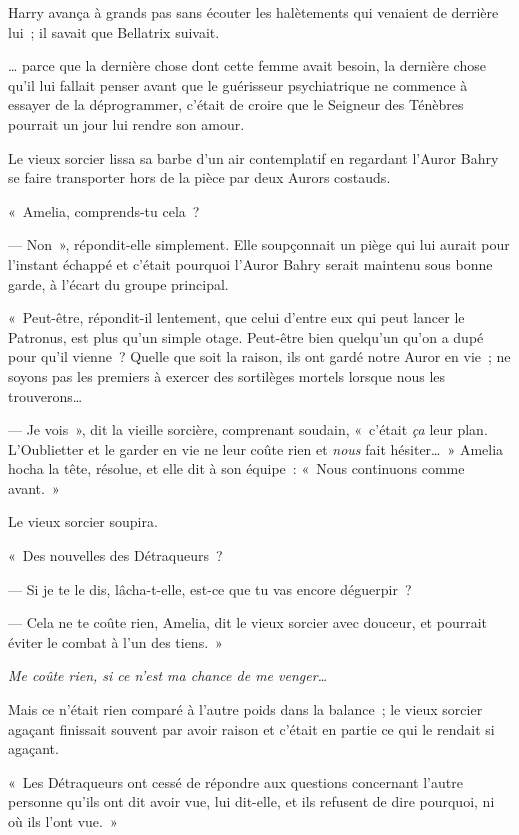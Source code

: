 Harry avança à grands pas sans écouter les halètements qui venaient de derrière lui~; il savait que Bellatrix suivait.

… parce que la dernière chose dont cette femme avait besoin, la dernière chose qu'il lui fallait penser avant que le guérisseur psychiatrique ne commence à essayer de la déprogrammer, c'était de croire que le Seigneur des Ténèbres pourrait un jour lui rendre son amour.

\later

Le vieux sorcier lissa sa barbe d'un air contemplatif en regardant l'Auror Bahry se faire transporter hors de la pièce par deux Aurors costauds.

«~Amelia, comprends-tu cela~?

--- Non~», répondit-elle simplement.
Elle soupçonnait un piège qui lui aurait pour l'instant échappé et c'était pourquoi l'Auror Bahry serait maintenu sous bonne garde, à l'écart du groupe principal.

«~Peut-être, répondit-il lentement, que celui d'entre eux qui peut lancer le Patronus, est plus qu'un simple otage.
Peut-être bien quelqu'un qu'on a dupé pour qu'il vienne~?
Quelle que soit la raison, ils ont gardé notre Auror en vie~; ne soyons pas les premiers à exercer des sortilèges mortels lorsque nous les trouverons…

--- Je vois~», dit la vieille sorcière, comprenant soudain, «~c'était \emph{ça} leur plan.
L'Oublietter et le garder en vie ne leur coûte rien et \emph{nous} fait hésiter…~»
Amelia hocha la tête, résolue, et elle dit à son équipe~: «~Nous continuons comme avant.~»

Le vieux sorcier soupira.

«~Des nouvelles des Détraqueurs~?

--- Si je te le dis, lâcha-t-elle, est-ce que tu vas encore déguerpir~?

--- Cela ne te coûte rien, Amelia, dit le vieux sorcier avec douceur, et pourrait éviter le combat à l'un des tiens.~»

\emph{Me coûte rien, si ce n'est ma chance de me venger…}

Mais ce n'était rien comparé à l'autre poids dans la balance~; le vieux sorcier agaçant finissait souvent par avoir raison et c'était en partie ce qui le rendait si agaçant.

«~Les Détraqueurs ont cessé de répondre aux questions concernant l'autre personne qu'ils ont dit avoir vue, lui dit-elle, et ils refusent de dire pourquoi, ni où ils l'ont vue.~»

